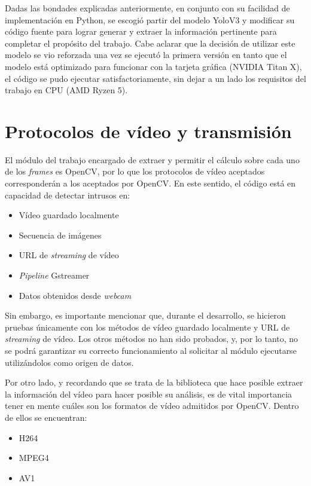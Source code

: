 Dadas las bondades explicadas anteriormente, en conjunto con su facilidad de implementación en Python, se escogió partir del modelo YoloV3 y modificar su código fuente para lograr generar y extraer la información pertinente para completar el propósito del trabajo. Cabe aclarar que la decisión de utilizar este modelo se vio reforzada una vez se ejecutó la primera versión en tanto que el modelo está optimizado para funcionar con la tarjeta gráfica (NVIDIA Titan X), el código se pudo ejecutar satisfactoriamente, sin dejar a un lado los requisitos del trabajo en CPU (AMD Ryzen 5). 

\section{Protocolos de vídeo y transmisión}

El módulo del trabajo encargado de extraer y permitir el cálculo sobre cada uno de los \textit{frames} es OpenCV, por lo que los protocolos de vídeo aceptados corresponderán a los aceptados por OpenCV. En este sentido, el código está en capacidad de detectar intrusos en:

\begin{itemize}
	\item Vídeo guardado localmente
	\item Secuencia de imágenes
	\item URL de \textit{streaming} de vídeo
	\item \textit{Pipeline} Gstreamer
	\item Datos obtenidos desde \textit{webcam}
\end{itemize}

Sin embargo, es importante mencionar que, durante el desarrollo, se hicieron pruebas únicamente con los métodos de vídeo guardado localmente y URL de \textit{streaming} de vídeo. Los otros métodos no han sido probados, y, por lo tanto, no se podrá garantizar su correcto funcionamiento al solicitar al módulo ejecutarse utilizándolos como origen de datos. 

Por otro lado, y recordando que se trata de la biblioteca que hace posible extraer la información del vídeo para hacer posible su análisis, es de vital importancia tener en mente cuáles son los formatos de vídeo admitidos por OpenCV. Dentro de ellos se encuentran:

\begin{itemize}
	\item H264
	\item MPEG4
	\item AV1
\end{itemize}

